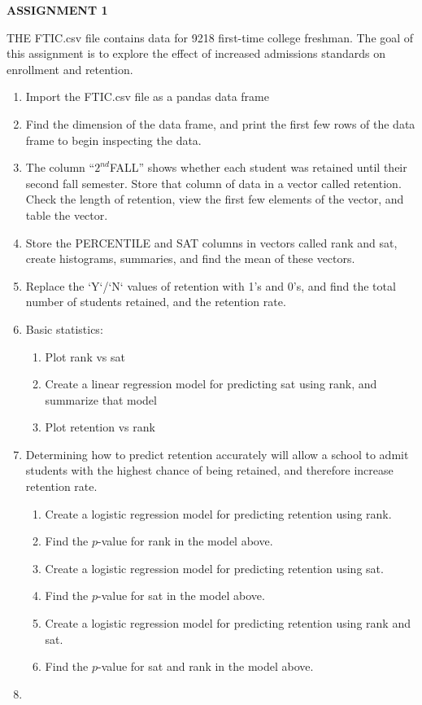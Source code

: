\documentclass[11pt]{article}
\begin{document}
\begin{center}
	\textbf{\Large{ASSIGNMENT 1}}
\end{center}
THE FTIC.csv file contains data for 9218 first-time college freshman.  The goal of this assignment is to explore the effect of increased admissions standards on enrollment and retention.
\begin{enumerate}
	\item Import the FTIC.csv file as a pandas data frame
	\item Find the dimension of the data frame, and print the first few rows of the data frame to begin inspecting the data.
	\item The column ``$2^{nd}$FALL'' shows whether each student was retained until their second fall semester.  Store that column of data in a vector called retention.  Check the length of retention, view the first few elements of the vector, and table the vector.
	\item Store the PERCENTILE and SAT columns in vectors called rank and sat, create histograms, summaries, and find the mean of these vectors.
	\item Replace the `Y`/`N` values of retention with 1's and 0's, and find the total number of students retained, and the retention rate.
	\item Basic statistics:
		\begin{enumerate}
			\item Plot rank vs sat
			\item Create a linear regression model for predicting sat using rank, and summarize that model
			\item Plot retention vs rank
		\end{enumerate}
	\item Determining how to predict retention accurately will allow a school to admit students with the highest chance of being retained, and therefore increase retention rate.
		\begin{enumerate}
			\item Create a logistic regression model for predicting retention using rank.  
			\item Find the $p$-value for rank in the model above.
			\item Create a logistic regression model for predicting retention using sat.
			\item Find the $p$-value for sat in the model above.
			\item Create a logistic regression model for predicting retention using rank and sat.
			\item Find the $p$-value for sat and rank in the model above.
		\end{enumerate}
	\item 
\end{enumerate}
\end{document}
